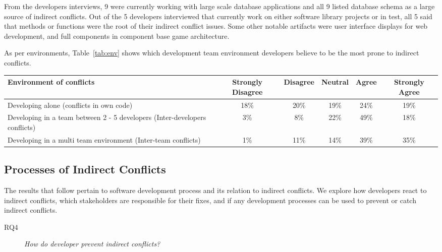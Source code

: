 \documentclass[conference]{IEEEtran}
\begin{document}
From the developers interviews, 9 were currently working with large scale database applications and all 9 listed database
schema as a large source of indirect conflicts. Out of the 5 developers interviewed that currently work on either software
library projects or in test, all 5 said that methods or functions were the root of their indirect conflict issues. Some
other notable artifacts were user interface displays for web development, and full components in component base game
architecture. 

As per environments, Table~\ref{tab:env} shows which development team environment developers believe to be the most
prone to indirect conflicts.

\begin{table*}[tb!]
\begin{center}
\begin{tabular}{| p{7cm} | c | c | c | c | c |}
\hline
Environment of conflicts & Strongly Disagree & Disagree & Neutral & Agree & Strongly Agree \\
\hline
\hline
Developing alone (conflicts in own code) & 18\% & 20\% & 19\% & 24\% & 19\% \\ \hline
Developing in a team between 2 - 5 developers (Inter-developers conflicts) & 3\% & 8\% & 22\% & 49\% & 18\% \\ \hline
Developing in a multi team environment (Inter-team conflicts) & 1\% & 11\% & 14\% & 39\% & 35\% \\ \hline
\end{tabular}
\end{center}
\caption{Results of survey questions to development environments in which indirect conflicts are likely to occur, in terms of percentage
of developers surveyed.\label{tab:env}}
\end{table*}

\subsection{Processes of Indirect Conflicts}

The results that follow pertain to software development process and its relation to indirect conflicts. We explore
how developers react to indirect conflicts, which stakeholders are responsible for their fixes, and if any development
processes can be used to prevent or catch indirect conflicts.

\begin{description}
	\item[RQ4] \textit{How do developer prevent indirect conflicts?}
\end{description}
\end{document}
